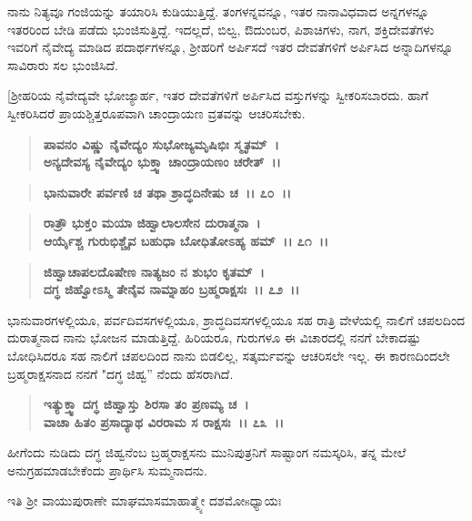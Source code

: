 ನಾನು ನಿತ್ಯವೂ ಗಂಜಿಯನ್ನು ತಯಾರಿಸಿ ಕುಡಿಯುತ್ತಿದ್ದೆ. ತಂಗಳನ್ನವನ್ನೂ, ಇತರ ನಾನಾವಿಧವಾದ ಅನ್ನಗಳನ್ನೂ ಇತರರಿಂದ ಬೇಡಿ ಪಡೆದು ಭುಂಜಿಸುತ್ತಿದ್ದೆ. ಇದಲ್ಲದೆ, ಬಿಲ್ವ, ಔದುಂಬರ, ಪಿಶಾಚಿಗಳು, ನಾಗ, ಶಕ್ತಿದೇವತೆಗಳು ಇವರಿಗೆ ನೈವೇದ್ಯ ಮಾಡಿದ ಪದಾರ್ಥಗಳನ್ನೂ, ಶ‍್ರೀಹರಿಗೆ ಅರ್ಪಿಸದೆ ಇತರ ದೇವತೆಗಳಿಗೆ ಅರ್ಪಿಸಿದ ಅನ್ನಾದಿಗಳನ್ನೂ ಸಾವಿರಾರು ಸಲ ಭುಂಜಿಸಿದೆ.

[ಶ‍್ರೀಹರಿಯ ನೈವೇದ್ಯವೇ ಭೋಜ್ಯಾರ್ಹ, ಇತರ ದೇವತೆಗಳಿಗೆ ಅರ್ಪಿಸಿದ ವಸ್ತುಗಳನ್ನು ಸ್ವೀಕರಿಸಬಾರದು. ಹಾಗೆ ಸ್ವೀಕರಿಸಿದರೆ ಪ್ರಾಯಶ್ಚಿತ್ತರೂಪವಾಗಿ ಚಾಂದ್ರಾಯಣ ವ್ರತವನ್ನು ಆಚರಿಸಬೇಕು.

\begin{verse}
\textbf{ಪಾವನಂ ವಿಷ್ಣು ನೈವೇದ್ಯಂ ಸುಭೋಜ್ಯಮೃಷಿಭಿಃ ಸ್ಮೃತಮ್~।}\\\textbf{ಅನ್ಯದೇವಸ್ಯ ನೈವೇದ್ಯಂ ಭುಕ್ತ್ವಾ ಚಾಂದ್ರಾಯಣಂ ಚರೇತ್~।।}
\end{verse}

\vauthor{\textbf{(ಶ‍್ರೀ ಕೃಷ್ಣಾಮೃತಮಹಾರ್ಣವ)]}}

\begin{verse}
\textbf{ಭಾನುವಾರೇ ಪರ್ವಣಿ ಚ ತಥಾ ಶ್ರಾದ್ಧದಿನೇಷು ಚ~।। ೭೦~।।} 
\end{verse}

\begin{verse}
\textbf{ರಾತ್ರೌ ಭುಕ್ತಂ ಮಯಾ ಜಿಹ್ವಾಲಾಲಸೇನ ದುರಾತ್ಮನಾ~।}\\\textbf{ಆರ್ಯೈಶ್ಚ ಗುರುಭಿಶ್ಚೈವ ಬಹುಧಾ ಬೋಧಿತೋಽಹ್ಯ ಹಮ್~।। ೭೧~।। }
\end{verse}

\begin{verse}
\textbf{ಜಿಹ್ವಾಚಾಪಲದೊಷೇಣ ನಾತ್ಯಜಂ ನ ಶುಭಂ ಕೃತಮ್~।}\\\textbf{ದಗ್ಧ ಜಿಹ್ವೋಽಸ್ಮಿ ತೇನೈವ ನಾಮ್ನಾಹಂ ಬ್ರಹ್ಮರಾಕ್ಷಸಃ~।। ೭೨~।।}
\end{verse}

ಭಾನುವಾರಗಳಲ್ಲಿಯೂ, ಪರ್ವದಿವಸಗಳಲ್ಲಿಯೂ, ಶ್ರಾದ್ಧದಿವಸಗಳಲ್ಲಿಯೂ ಸಹ ರಾತ್ರಿ ವೇಳೆಯಲ್ಲಿ ನಾಲಿಗೆ ಚಪಲದಿಂದ ದುರಾತ್ಮನಾದ ನಾನು ಭೋಜನ ಮಾಡುತ್ತಿದ್ದೆ. ಹಿರಿಯರೂ, ಗುರುಗಳೂ ಈ ವಿಚಾರದಲ್ಲಿ ನನಗೆ ಬೇಕಾದಷ್ಟು ಬೋಧಿಸಿದರೂ ಸಹ ನಾಲಿಗೆ ಚಪಲದಿಂದ ನಾನು ಬಿಡಲಿಲ್ಲ, ಸತ್ಕರ್ಮವನ್ನು ಆಚರಿಸಲೇ ಇಲ್ಲ. ಈ ಕಾರಣದಿಂದಲೇ ಬ್ರಹ್ಮರಾಕ್ಷಸನಾದ ನನಗೆ "ದಗ್ಧ ಜಿಹ್ವ” ನೆಂದು ಹೆಸರಾಗಿದೆ.

\begin{verse}
\textbf{ಇತ್ಯುಕ್ತ್ವಾ ದಗ್ಧ ಜಿಹ್ವಾಸ್ತು ಶಿರಸಾ ತಂ ಪ್ರಣಮ್ಯ ಚ~।}\\\textbf{ವಾಚಾ ಹಿತಂ ಪ್ರಸಾದ್ಯಾಥ ವಿರರಾಮ ಸ ರಾಕ್ಷಸಃ~।। ೭೩~।।}
\end{verse}

ಹೀಗೆಂದು ನುಡಿದು ದಗ್ಧ ಜಿಹ್ವನೆಂಬ ಬ್ರಹ್ಮರಾಕ್ಷಸನು ಮುನಿಪುತ್ರನಿಗೆ ಸಾಷ್ಟಾಂಗ ನಮಸ್ಕರಿಸಿ, ತನ್ನ ಮೇಲೆ ಅನುಗ್ರಹಮಾಡಬೇಕೆಂದು ಪ್ರಾರ್ಥಿಸಿ ಸುಮ್ಮನಾದನು.

\begin{center}
ಇತಿ ಶ‍್ರೀ ವಾಯುಪುರಾಣೇ ಮಾಘಮಾಸಮಾಹಾತ್ಮ್ಯೇ ದಶಮೋsಧ್ಯಾಯಃ
\end{center}

